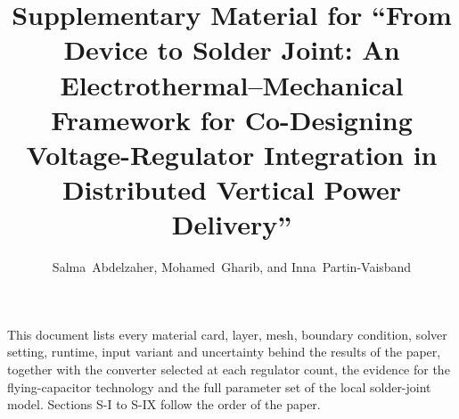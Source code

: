 \documentclass[journal,onecolumn,10pt]{IEEEtran}
\begin{document}
\title{Supplementary Material for ``From Device to Solder Joint: An Electrothermal--Mechanical
Framework for Co-Designing Voltage-Regulator Integration in Distributed Vertical Power
Delivery''}
\author{Salma~Abdelzaher, Mohamed~Gharib, and Inna~Partin-Vaisband}
\maketitle
This document lists every material card, layer, mesh, boundary condition, solver setting,
runtime, input variant and uncertainty behind the results of the paper, together with the
converter selected at each regulator count, the evidence for the flying-capacitor technology and
the full parameter set of the local solder-joint model. Sections S-I to S-IX follow the order of
the paper.



\end{document}
